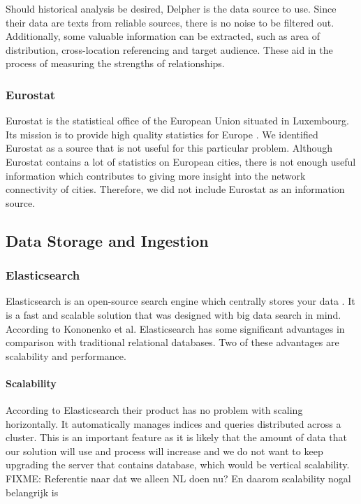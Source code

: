 Should historical analysis be desired, Delpher is the data source to use. Since their data are texts from reliable sources, there is no noise to be filtered out. Additionally, some valuable information can be extracted, such as area of distribution, cross-location referencing and target audience. These aid in the process of measuring the strengths of relationships.

\subsubsection{Eurostat}
Eurostat is the statistical office of the European Union situated in Luxembourg. Its mission is to provide high quality statistics for Europe \cite{Eurostat}. We identified Eurostat as a source that is not useful for this particular problem. Although Eurostat contains a lot of statistics on European cities, there is not enough useful information which contributes to giving more insight into the network connectivity of cities. Therefore, we did not include Eurostat as an information source.

\subsection{Data Storage and Ingestion}
\subsubsection{Elasticsearch}
Elasticsearch is an open-source search engine which centrally stores your data \cite{Elasticsearch}. It is a fast and scalable solution that was designed with big data search in mind. According to Kononenko et al. \cite{Kononenko2014} Elasticsearch has some significant advantages in comparison with traditional relational databases. Two of these advantages are scalability and performance. 

\paragraph{Scalability} According to Elasticsearch \cite{Elasticsearch} their product has no problem with scaling horizontally. It automatically manages indices and queries distributed across a cluster. This is an important feature as it is likely that the amount of data that our solution will use and process will increase and we do not want to keep upgrading the server that contains database, which would be vertical scalability. {\color{red} FIXME: Referentie naar dat we alleen NL doen nu? En daarom scalability nogal belangrijk is}

